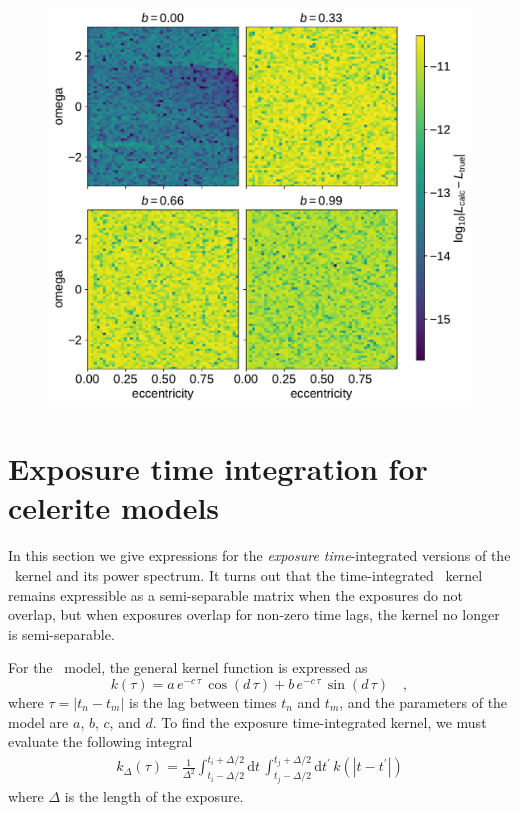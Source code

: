 \documentclass[modern]{aastex62}
\begin{document}
\begin{figure}[htbp]
\begin{centering}
\includegraphics[width=0.8\linewidth]{figures/contact_points.pdf}
\end{centering}
\end{figure}

\section{Exposure time integration for celerite models} \label{sec:time_integration}

In this section we give expressions for the {\it exposure time}-integrated versions of the \celerite\ kernel and its power
spectrum.  It turns out that the time-integrated \celerite\ kernel
remains expressible as a semi-separable matrix when the exposures
do not overlap, but when exposures overlap for non-zero time lags,
the kernel no longer is semi-separable.

For the \celerite\ model, the general kernel function is expressed as
\begin{equation}
k(\tau) = a\,e^{-c\,\tau}\,\cos(d\,\tau) + b\,e^{-c\,\tau}\,\sin(d\,\tau) \quad,
\end{equation}
where $\tau = \vert t_n-t_m \vert$ is the lag between times $t_n$ and $t_m$, and the parameters of the model are $a$, $b$, $c$, and $d$.
To find the exposure time-integrated kernel, we must evaluate the following integral
\begin{eqnarray}
k_\Delta(\tau) = \frac{1}{\Delta^2}\int_{t_i-\Delta/2}^{t_i+\Delta/2} \mathrm{d}t \,\int_{t_j-\Delta/2}^{t_j+\Delta/2}\mathrm{d}t^\prime\,k(|t - t^\prime|)
\end{eqnarray}
where $\Delta$ is the length of the exposure.
\end{document}
